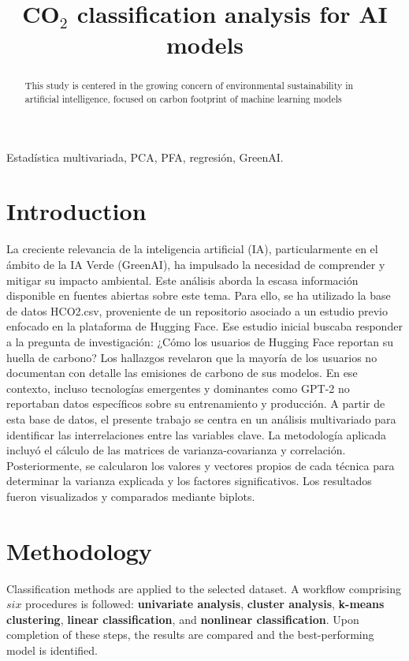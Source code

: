 \documentclass[journal]{IEEEtran}
\title{ CO$_{2}$ classification analysis for AI models}
\author{
	\IEEEauthorblockN{Juan Felipe Gallo Rendón\IEEEauthorrefmark{1}}
	\IEEEauthorblockA{\textit{Engineering department} \\
		\textit{University of Antioquia}\\
		Medellín, Colombia}
}
\begin{document}
	\maketitle

	\begin{abstract}
		This study is centered in the growing concern of environmental sustainability in artificial intelligence, focused on carbon footprint of machine learning models
	\end{abstract}

	\begin{IEEEkeywords}
		Estadística multivariada, PCA, PFA, regresión, GreenAI.
	\end{IEEEkeywords}


	\section{Introduction}
	\label{sec:introduction}
	La creciente relevancia de la inteligencia artificial (IA), particularmente en el ámbito de la IA Verde (GreenAI)\cite{green_ai_ust}, ha impulsado la necesidad de comprender y mitigar su impacto ambiental. Este análisis aborda la escasa información disponible en fuentes abiertas sobre este tema. Para ello, se ha utilizado la base de datos HCO2.csv, proveniente de un repositorio asociado a un estudio previo enfocado en la plataforma de Hugging Face\cite{exploring_carbon_footprint}. Ese estudio inicial buscaba responder a la pregunta de investigación: ¿Cómo los usuarios de Hugging Face reportan su huella de carbono? Los hallazgos revelaron que la mayoría de los usuarios no documentan con detalle las emisiones de carbono de sus modelos. En ese contexto, incluso tecnologías emergentes y dominantes como GPT-2 no reportaban datos específicos sobre su entrenamiento y producción.
	A partir de esta base de datos, el presente trabajo se centra en un análisis multivariado para identificar las interrelaciones entre las variables clave. La metodología aplicada incluyó el cálculo de las matrices de varianza-covarianza y correlación. Posteriormente, se calcularon los valores y vectores propios de cada técnica para determinar la varianza explicada y los factores significativos. Los resultados fueron visualizados y comparados mediante biplots.


	\section{Methodology}
	\label{sec:methodology}
	Classification methods are applied to the selected dataset. A workflow comprising $six$ procedures is followed: \textbf{univariate analysis}, \textbf{cluster analysis}, \textbf{k-means clustering}, \textbf{linear classification}, and \textbf{nonlinear classification}. Upon completion of these steps, the results are compared and the best-performing model is identified.
\end{document}
